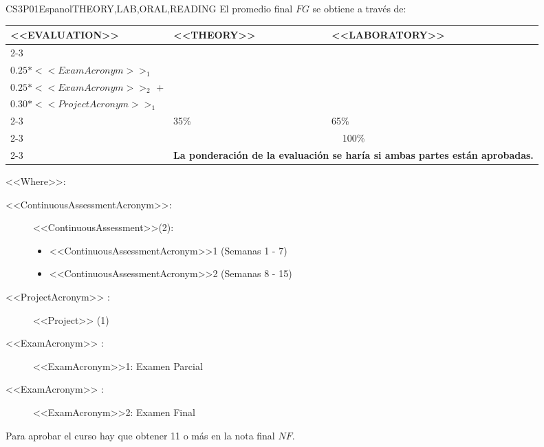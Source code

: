    \begin{evaluation}{CS3P01}{Espanol}{THEORY,LAB,ORAL,READING}
    El promedio final $FG$ se obtiene a través de:

    \begin{tabularx}{0.9\textwidth}{|X|p{}|p{}|} \hline
    \multirow{4}{*}{\uppercase{<<Evaluation>>}} & \uppercase{<<Theory>>} & \uppercase{<<Laboratory>>} \\ \cline{2-3}
    & %
        \begin{minipage}{0.95\textwidth}
        \begin{tabular}{l}
          $0.10*<<ContinuousAssessmentAcronym>>_{1}$  + \\
          $0.25*<<ExamAcronym>>_{1}$ 
        \end{tabular} 
        \end{minipage} 
    & %
        \begin{minipage}{0.95\textwidth}
        \begin{tabular}{l}
          $0.10*<<ContinuousAssessmentAcronym>>_{2}$  + \\
          $0.25*<<ExamAcronym>>_{2}$  +  \\
          $0.30*<<ProjectAcronym>>_{1}$
        \end{tabular} 
        \end{minipage}                 \\ \cline{2-3}
    
    & %
    35\% 
    & %
    65\% \\ \cline{2-3}
    & \multicolumn{2}{c|}{100\%}  \\ \cline{2-3}
    & \multicolumn{2}{c|}{\textbf{La ponderación de la evaluación se haría si ambas partes están aprobadas.}}  \\ \hline
    \end{tabularx}
      
    \vspace{2mm}
    \noindent <<Where>>:
    \begin{description}
        \item[<<ContinuousAssessmentAcronym>>:]<<ContinuousAssessment>>(2):
        \begin{itemize}
                \item <<ContinuousAssessmentAcronym>>1 (Semanas 1 - 7) 
                \item <<ContinuousAssessmentAcronym>>2 (Semanas 8 - 15)
        \end{itemize}
        \item[<<ProjectAcronym>> :] <<Project>> (1)
        \item[<<ExamAcronym>> :] <<ExamAcronym>>1: Examen Parcial
        \item[<<ExamAcronym>> :] <<ExamAcronym>>2: Examen Final
    \end{description}

    \noindent Para aprobar el curso hay que obtener 11 o más en la nota final $NF$.
    \end{evaluation}
   
